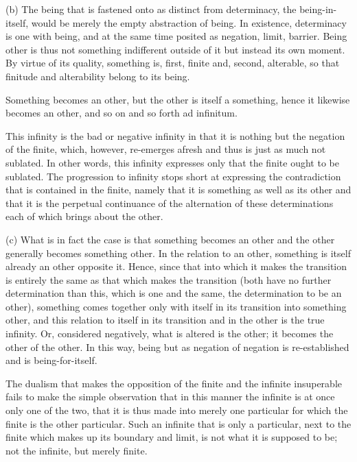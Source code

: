 (b) The being that is fastened onto as distinct from determinacy,
the being-in-itself, would be merely the empty abstraction of being.
In existence, determinacy is one with being, and
at the same time posited as negation, limit, barrier.
Being other is thus not something indifferent outside of it
but instead its own moment.
By virtue of its quality, something is,
first, finite and, second, alterable,
so that finitude and alterability belong to its being.

Something becomes an other,
but the other is itself a something,
hence it likewise becomes an other,
and so on and so forth ad infinitum.

This infinity is the bad or negative infinity in that
it is nothing but the negation of the finite, which, however,
re-emerges afresh and thus is just as much not sublated.
In other words, this infinity expresses only that
the finite ought to be sublated.
The progression to infinity stops short at expressing
the contradiction that is contained in the finite,
namely that it is something as well as its other and
that it is the perpetual continuance of the alternation
of these determinations each of which brings about the other.

(c) What is in fact the case is that something becomes an other and
the other generally becomes something other.
In the relation to an other,
something is itself already an other opposite it.
Hence, since that into which it makes the transition is
entirely the same as that which makes the transition
(both have no further determination than this,
which is one and the same, the determination to be an other),
something comes together only with itself
in its transition into something other, and
this relation to itself in its transition and
in the other is the true infinity.
Or, considered negatively, what is altered is the other;
it becomes the other of the other.
In this way, being but as negation of negation is re-established
and is being-for-itself.

    The dualism that makes the opposition of the finite and the infinite
    insuperable fails to make the simple observation that in this manner
    the infinite is at once only one of the two, that it is thus made into
    merely one particular for which the finite is the other particular.
    Such an infinite that is only a particular, next to the finite which
    makes up its boundary and limit, is not what it is supposed to be;
    not the infinite, but merely finite.

